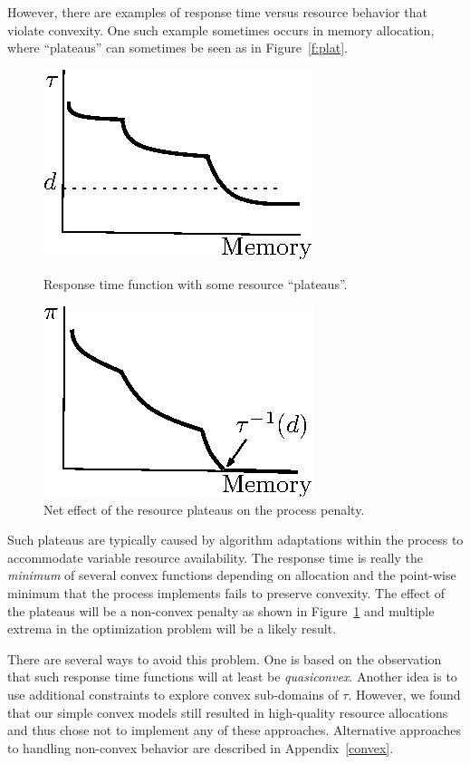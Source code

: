 However, there are examples of response time versus resource behavior that violate convexity.  One such example sometimes occurs in memory allocation, where ``plateaus'' can sometimes be seen as in Figure~\ref{f:plat}.
\begin{figure}[b]
\parbox{1.6in}{
\includegraphics*{Plateau1.eps}
\caption{\label{f:plat}Response time function with some resource ``plateaus''.}
}
\hspace{\fill}
\parbox{1.6in}{
\includegraphics*{Plateau2.eps}
\caption{\label{f:plateffect}Net effect of the resource plateaus on the process penalty.}
}
\end{figure}

Such plateaus are typically caused by algorithm adaptations within the process to accommodate variable resource availability.  The response time is really the \emph{minimum} of several convex functions depending on allocation and the point-wise minimum that the process implements fails to preserve convexity.  The effect of the plateaus will be a non-convex penalty as shown in Figure~\ref{f:plateffect} and multiple extrema in the optimization problem will be a likely result.

There are several ways to avoid this problem.  One is based on the observation that such response time functions will at least be \emph{quasiconvex}.  Another idea is to use additional constraints to explore convex sub-domains of $\tau$.  However, we found that our simple convex models still resulted in high-quality resource allocations and thus chose not to implement any of these approaches.  Alternative approaches to handling non-convex behavior are described in Appendix~\ref{convex}.

